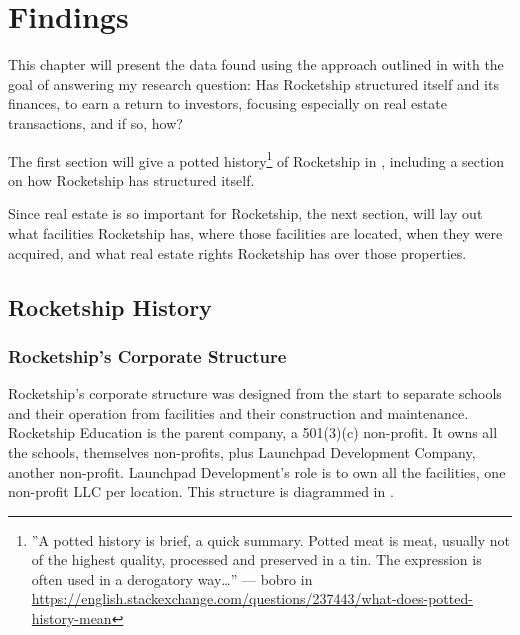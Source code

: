 
\chapter{Findings}\label{ch:findings}\noindent
\bigskip%

This chapter will present the data found using the approach outlined in  with the goal of answering my research question: Has Rocketship structured itself and its finances, to earn a return to investors, focusing especially on real estate transactions, and if so, how?

The first section will give a potted history\footnote{''A potted history is brief, a quick summary. Potted meat is meat, usually not of the highest quality, processed and preserved in a tin. The expression is often used in a derogatory way\ldots'' — bobro in \url{https://english.stackexchange.com/questions/237443/what-does-potted-history-mean}} of Rocketship in , including a section on how Rocketship has structured itself. 

Since real estate is so important for Rocketship, the next section,  will lay out what facilities Rocketship has, where those facilities are located, when they were acquired, and what real estate rights Rocketship has over those properties.

\section{Rocketship History}\label{sec:history}\indent

\subsection{Rocketship's Corporate Structure}\label{sec:rocketship-corp-struct}\indent

Rocketship's corporate structure was designed from the start to separate schools and their operation from facilities and their construction and maintenance. Rocketship Education is the parent company, a 501(3)(c) non-profit. It owns all the schools, themselves non-profits, plus Launchpad Development Company, another non-profit. Launchpad Development's role is to own all the facilities, one non-profit LLC per location. This structure is diagrammed in .

